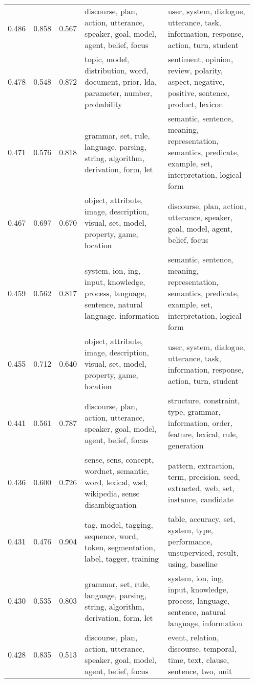 \begin{tabular}{cccp{5cm}p{5cm}}
0.486 & 0.858 & 0.567 & discourse, plan, action, utterance, speaker, goal, model, agent, belief, focus & user, system, dialogue, utterance, task, information, response, action, turn, student \\
0.478 & 0.548 & 0.872 & topic, model, distribution, word, document, prior, lda, parameter, number, probability & sentiment, opinion, review, polarity, aspect, negative, positive, sentence, product, lexicon \\
0.471 & 0.576 & 0.818 & grammar, set, rule, language, parsing, string, algorithm, derivation, form, let & semantic, sentence, meaning, representation, semantics, predicate, example, set, interpretation, logical form \\
0.467 & 0.697 & 0.670 & object, attribute, image, description, visual, set, model, property, game, location & discourse, plan, action, utterance, speaker, goal, model, agent, belief, focus \\
0.459 & 0.562 & 0.817 & system, ion, ing, input, knowledge, process, language, sentence, natural language, information & semantic, sentence, meaning, representation, semantics, predicate, example, set, interpretation, logical form \\
0.455 & 0.712 & 0.640 & object, attribute, image, description, visual, set, model, property, game, location & user, system, dialogue, utterance, task, information, response, action, turn, student \\
0.441 & 0.561 & 0.787 & discourse, plan, action, utterance, speaker, goal, model, agent, belief, focus & structure, constraint, type, grammar, information, order, feature, lexical, rule, generation \\
0.436 & 0.600 & 0.726 & sense, sens, concept, wordnet, semantic, word, lexical, wsd, wikipedia, sense disambiguation & pattern, extraction, term, precision, seed, extracted, web, set, instance, candidate \\
0.431 & 0.476 & 0.904 & tag, model, tagging, sequence, word, token, segmentation, label, tagger, training & table, accuracy, set, system, type, performance, unsupervised, result, using, baseline \\
0.430 & 0.535 & 0.803 & grammar, set, rule, language, parsing, string, algorithm, derivation, form, let & system, ion, ing, input, knowledge, process, language, sentence, natural language, information \\
0.428 & 0.835 & 0.513 & discourse, plan, action, utterance, speaker, goal, model, agent, belief, focus & event, relation, discourse, temporal, time, text, clause, sentence, two, unit \\

\end{tabular}
